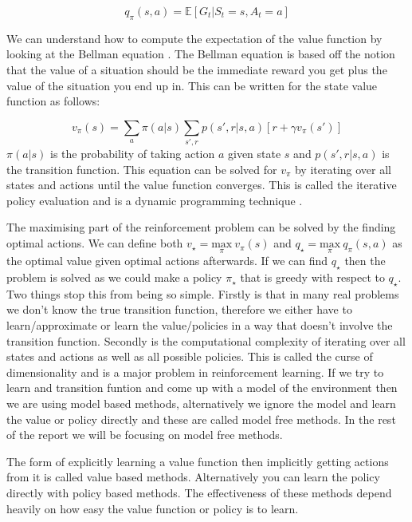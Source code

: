 \begin{equation}
q_{\pi}(s,a) = \mathbb{E}\left[ G_{t} | S_{t}=s, A_{t}=a \right] 
\end{equation}

We can understand how to compute the expectation of the value function by looking at the Bellman equation \cite{suttonReinforcementLearningSecond2018}. The Bellman equation is based off the notion that the value of a situation should be the immediate reward you get plus the value of the situation you end up in. This can be written for the state value function as follows:

\begin{equation}
v_{\pi}(s)=\sum_{a}\pi(a|s)\sum_{s',r}p(s',r|s,a)\left[ r+\gamma v_{\pi}(s') \right]
\end{equation}
$\pi(a|s)$ is the probability of taking action $a$ given state $s$ and $p(s',r|s,a)$ is the transition function. This equation can be solved for $v_{\pi}$ by iterating over all states and actions until the value function converges. This is called the iterative policy evaluation and is a dynamic programming technique \cite{bellmanDynamicProgramming1957}.

The maximising part of the reinforcement problem can be solved by the finding optimal actions. We can define both $v_{\star}=\underset{ \pi }{ \text{max} }\ v_{\pi}(s)$ and $q_{\star}=\underset{ \pi }{ \text{max} }\ q_{\pi}(s,a)$ as the optimal value given optimal actions afterwards.
If we can find $q_{\star}$ then the problem is solved as we could make a policy $\pi_{\star}$ that is greedy with respect to $q_{\star}$. Two things stop this from being so simple. Firstly is that in many real problems we don't know the true transition function, therefore we either have to learn/approximate or learn the value/policies in a way that doesn't involve the transition function. Secondly is the computational complexity of iterating over all states and actions as well as all possible policies. This is called the curse of dimensionality and is a major problem in reinforcement learning. If we try to learn and transition funtion and come up with a model of the environment then we are using model based methods, alternatively we ignore the model and learn the value or policy directly and these are called model free methods. In the rest of the report we will be focusing on model free methods.

The form of explicitly learning a value function then implicitly getting actions from it is called value based methods. Alternatively you can learn the policy directly with policy based methods. The effectiveness of these methods depend heavily on how easy the value function or policy is to learn.